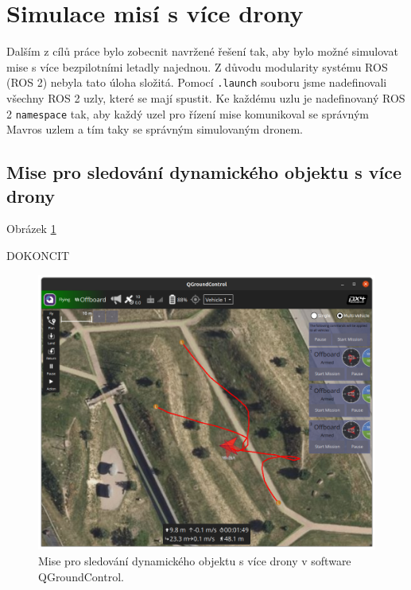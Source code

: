 \section{Simulace misí s více drony}

Dalším z cílů práce bylo zobecnit navržené řešení tak, aby bylo možné simulovat mise s více bezpilotními letadly najednou. Z důvodu modularity systému ROS (ROS 2) nebyla tato úloha složitá. Pomocí \texttt{.launch} souboru jsme nadefinovali všechny ROS 2 uzly, které se mají spustit. Ke každému uzlu je nadefinovaný ROS 2 \texttt{namespace} tak, aby každý uzel pro řízení mise komunikoval se správným Mavros uzlem a tím taky se správným simulovaným dronem.

\subsection{Mise pro sledování dynamického objektu s více drony}

Obrázek \ref{fig:SIM3MULQG} 

DOKONCIT

\begin{figure}[!ht]
  \begin{center}
    \includegraphics[scale=0.41]{obrazky/QGMULTIPLE.png}
  \end{center}
  \caption[Mise pro sledování dynamického objektu s více drony v software QGroundControl]{Mise pro sledování dynamického objektu s více drony v software QGroundControl.}
  \label{fig:SIM3MULQG}
\end{figure}

